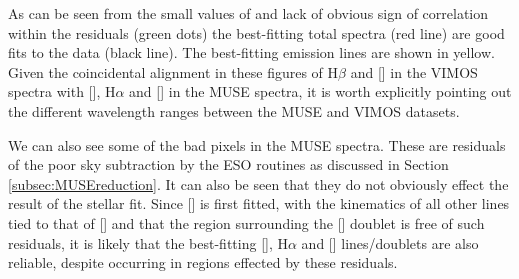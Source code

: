 
			As can be seen from the small values of and lack of obvious sign of correlation within the residuals (green dots) the best-fitting total spectra (red line) are good fits to the data (black line). The best-fitting emission lines are shown in yellow. Given the coincidental alignment in these figures of H$\beta$ and [] in the VIMOS spectra with [], H$\alpha$ and [] in the MUSE spectra, it is worth explicitly pointing out the different wavelength ranges between the MUSE and VIMOS datasets. 

			We can also see some of the bad pixels in the MUSE spectra. These are residuals of the poor sky subtraction by the ESO routines as discussed in Section \ref{subsec:MUSEreduction}. It can also be seen that they do not obviously effect the result of the stellar fit. Since [] is first fitted, with the kinematics of all other lines tied to that of [] and that the region surrounding the [] doublet is free of such residuals, it is likely that the best-fitting [], H$\alpha$ and [] lines/doublets are also reliable, despite occurring in regions effected by these residuals. 

